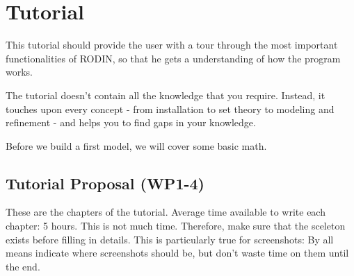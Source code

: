 \chapter{Tutorial}
\label{tutorial}

This tutorial should provide the user with a tour through the most important functionalities of RODIN, so that he gets a understanding of how the program works.

The tutorial doesn't contain all the knowledge that you require.  Instead, it touches upon every concept - from installation to set theory to modeling and refinement - and helps you to find gaps in your knowledge.

Before we build a first model, we will cover some basic math.

\section{Tutorial Proposal (WP1-4)}

These are the chapters of the tutorial.  Average time available to write each chapter: 5 hours.  This is not much time.  Therefore, make sure that the sceleton exists before filling in details.  This is particularly true for screenshots: By all means indicate where screenshots should be, but don't waste time on them until the end.

